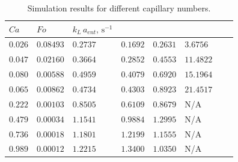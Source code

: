 \documentclass{article}
\newcommand{\vol}{k_L\,a}
\begin{document}
\begin{table}[htb!]
\begin{tabularx}{\textwidth}{|X|X|X|X|X|X|X|X|}
\hline
$Ca$&$Fo$&$\vol_{ent},\,\mathrm{s}^{-1}$&\\
\hline
$0.026$&$0.08493$&$0.2737$&$0.1692$&$0.2631$&$3.6756$\\
$0.047$&$0.02160$&$0.3664$&$0.2852$&$0.4553$&$11.4822$\\
$0.080$&$0.00588$&$0.4959$&$0.4079$&$0.6920$&$15.1964$\\
$0.065$&$0.00862$&$0.4734$&$0.4303$&$0.8923$&$21.4517$\\
$0.222$&$0.00103$&$0.8505$&$0.6109$&$0.8679$&N/A\\
$0.479$&$0.00034$&$1.1541$&$0.9884$&$1.2995$&N/A\\
$0.736$&$0.00018$&$1.1801$&$1.2199$&$1.1555$&N/A\\
$0.989$&$0.00012$&$1.2215$&$1.3400$&$1.0350$&N/A\\
\hline
\end{tabularx}
\caption{Simulation results for different capillary numbers.
\label{table:one_unit_comparison}}
\end{table}
 


\end{document}
